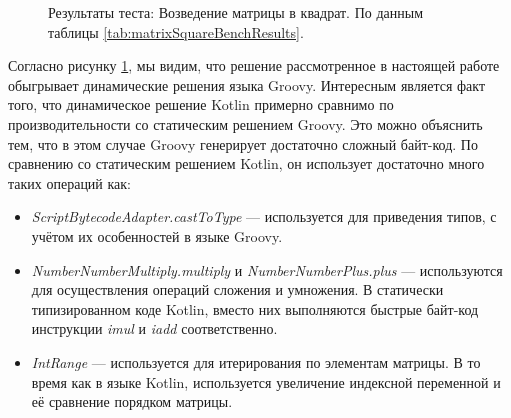 \begin{figure}
\caption{\label{graph:matrixSquareBenchResults}Результаты теста: Возведение матрицы в квадрат. По данным таблицы \ref{tab:matrixSquareBenchResults}.}
\end{figure}


Согласно рисунку \ref{graph:matrixSquareBenchResults}, мы видим, что решение рассмотренное в настоящей работе обыгрывает динамические решения языка Groovy. Интересным является факт того, что динамическое решение Kotlin примерно сравнимо по производительности со статическим решением Groovy. Это можно объяснить тем, что в этом случае Groovy генерирует достаточно сложный байт-код. По сравнению со статическим решением Kotlin, он использует достаточно много таких операций как:

\begin{itemize}
    \item \textit{ScriptBytecodeAdapter.castToType} --- используется для приведения типов, с учётом их особенностей в языке Groovy.
    \item \textit{NumberNumberMultiply.multiply} и \textit{NumberNumberPlus.plus} --- используются для осуществления операций сложения и умножения. В статически типизированном коде Kotlin, вместо них выполняются быстрые байт-код инструкции \textit{imul} и \textit{iadd} соответственно.
    \item \textit{IntRange} --- используется для итерирования по элементам матрицы. В то время как в языке Kotlin, используется увеличение индексной переменной и её сравнение порядком матрицы.
\end{itemize}

